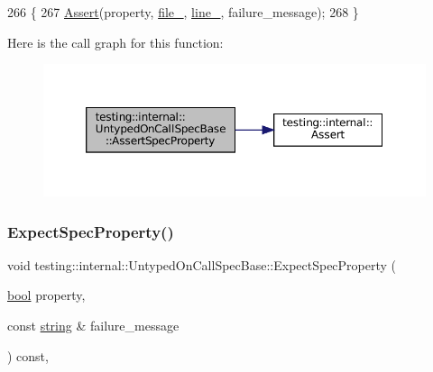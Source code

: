 \begin{DoxyCode}
266                                                                               \{
267     \hyperlink{namespacetesting_1_1internal_a7a259643b7f2d23ce2b757728df42c99}{Assert}(property, \hyperlink{classtesting_1_1internal_1_1UntypedOnCallSpecBase_adf4e6c5022dfeb482f5328e9bb58ba88}{file\_}, \hyperlink{classtesting_1_1internal_1_1UntypedOnCallSpecBase_a1dfa0dafaae6697f17adf5d837ca77c7}{line\_}, failure\_message);
268   \}
\end{DoxyCode}
Here is the call graph for this function\+:
\nopagebreak
\begin{figure}[H]
\begin{center}
\leavevmode
\includegraphics[width=350pt]{classtesting_1_1internal_1_1UntypedOnCallSpecBase_a83d223cf0e48fadc872a7b4062948df4_cgraph}
\end{center}
\end{figure}
\mbox{\label{classtesting_1_1internal_1_1UntypedOnCallSpecBase_a7eeba49b7b2968ebb4859c04684828b2}} 
\subsubsection{\texorpdfstring{Expect\+Spec\+Property()}{ExpectSpecProperty()}}
{\footnotesize\ttfamily void testing\+::internal\+::\+Untyped\+On\+Call\+Spec\+Base\+::\+Expect\+Spec\+Property (\begin{DoxyParamCaption}\item[{\hyperlink{classbool}{bool}}]{property,  }\item[{const \hyperlink{namespacetesting_1_1internal_a8e8ff5b11e64078831112677156cb111}{string} \&}]{failure\+\_\+message }\end{DoxyParamCaption}) const\hspace{0.3cm}{\ttfamily [inline]}, {\ttfamily [protected]}}



